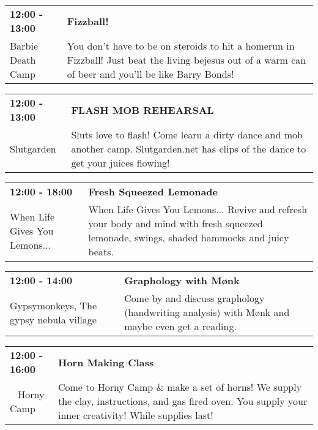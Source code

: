 \begin{tabular}{ p{1in} p{2.2in} }
    \textbf{12:00 - 13:00} & \textbf{Fizzball!} \\
    Barbie Death Camp \newline  & You don't have to be on steroids to hit a homerun in Fizzball!  Just beat the living bejesus out of a warm can of beer and you'll be like Barry Bonds! \\
    \hline 
\end{tabular}
    
\begin{tabular}{ p{1in} p{2.2in} }
    \textbf{12:00 - 13:00} & \textbf{FLASH MOB REHEARSAL} \\
    Slutgarden \newline  & Sluts love to flash! Come learn a dirty dance and mob another camp. Slutgarden.net has clips of the dance to get your juices flowing! \\
    \hline 
\end{tabular}
    
\begin{tabular}{ p{1in} p{2.2in} }
    \textbf{12:00 - 18:00} & \textbf{Fresh Squeezed Lemonade} \\
    When Life Gives You Lemons... \newline  & When Life Gives You Lemons... Revive and refresh your body and mind with fresh squeezed lemonade, swings, shaded hammocks and juicy beats. \\
    \hline 
\end{tabular}
    
\begin{tabular}{ p{1in} p{2.2in} }
    \textbf{12:00 - 14:00} & \textbf{Graphology with M\o nk} \\
    Gypsymonkeys, The \newline gypsy nebula village & Come by and discuss graphology (handwriting analysis) with M\o nk and maybe even get a reading. \\
    \hline 
\end{tabular}
    
\begin{tabular}{ p{1in} p{2.2in} }
    \textbf{12:00 - 16:00} & \textbf{Horn Making Class} \\
    ~ \newline Horny Camp & Come to Horny Camp \& make a set of horns! We supply the clay, instructions, and gas fired oven. You supply your inner creativity! While supplies last! \\
    \hline 
\end{tabular}
    
